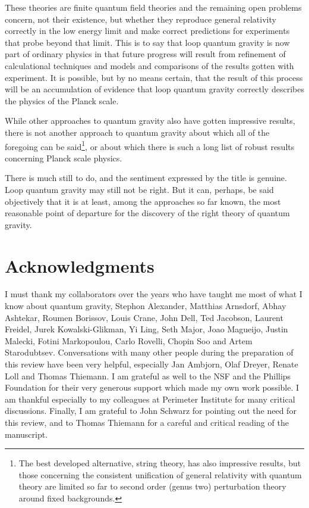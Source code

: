 \documentclass[12pt]{article}
\begin{document}
These theories are finite quantum field theories and the remaining open problems
concern, not their existence, but whether they reproduce general relativity correctly in the low
energy limit and make correct predictions for experiments that probe beyond that
limit. This is to say that loop quantum gravity is now part of ordinary physics in that future
progress will result from refinement of calculational techniques and models and
comparisons of the results gotten with experiment. It is possible, but by no means certain,
that the result of this process will be an accumulation of evidence that loop quantum
gravity correctly describes the physics of the Planck scale.  

While other approaches to quantum gravity also have gotten impressive results, 
there is not another approach to quantum gravity about which all of the foregoing can be
said\footnote{The best developed alternative, string theory, has also impressive
results, but  those concerning the consistent unification of general relativity with quantum
theory are limited so far to second order (genus two) perturbation theory around 
fixed backgrounds\cite{howfar}.}, or about which there is such a long list of robust results
concerning Planck scale physics. 

There is much still to do, and the sentiment expressed by the title is genuine.  
Loop quantum gravity may still not be right. But it can, perhaps, be said objectively that it is at
least, among the approaches so far known,  the most reasonable point of departure for
the discovery of the right theory of quantum gravity.


\section*{Acknowledgments}

I  must thank my collaborators over the
years who have taught me most of what I know about quantum gravity,
Stephon Alexander, Matthias Arnsdorf, Abhay Ashtekar,
Roumen Borissov, Louis Crane,  John Dell,
Ted Jacobson, Laurent Freidel, Jurek Kowalski-Glikman, Yi Ling, Seth Major,
Joao Magueijo, Justin Malecki, Fotini Markopoulou, Carlo Rovelli, Chopin Soo and Artem Starodubtsev.  Conversations with many other people during the preparation of this review 
have been very helpful, especially Jan Ambjorn, Olaf Dreyer, Renate Loll and Thomas
Thiemann.  
I am grateful as well to
the NSF and the Phillips Foundation for their very generous support which
made my own work possible.  
I am thankful especially to my colleagues at Perimeter Institute for many critical discussions.  Finally, I am grateful to John Schwarz for pointing out the need for this review, and to Thomas Thiemann for a careful and critical reading of the manuscript. 
\end{document}
